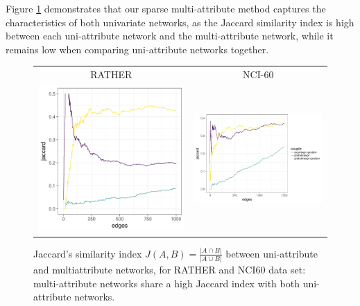 Figure \ref{fig:jaccard} demonstrates that our sparse multi-attribute
method captures the characteristics of both univariate networks, as
the Jaccard similarity index is high between each uni-attribute
network and the multi-attribute network, while it remains low when
comparing uni-attribute networks together.
\begin{figure}[htbp!]
  \centering
  \begin{tabular}{@{}cc@{}}
   RATHER & NCI-60 \\
    \includegraphics[width=.35\textwidth]{figures/jaccard_RATHER}
  & \includegraphics[width=.5\textwidth]{figures/jaccard_NCI60}
  \end{tabular}
  \caption{Jaccard's similarity index
    $J(A,B) = \frac{\left|A\cap B\right|}{\left|A\cup B\right|}$
    between uni-attribute and multiattribute networks, for RATHER and
    NCI60 data set: multi-attribute networks share a high Jaccard
    index with both uni-attribute networks.}
  \label{fig:jaccard}
\end{figure}

